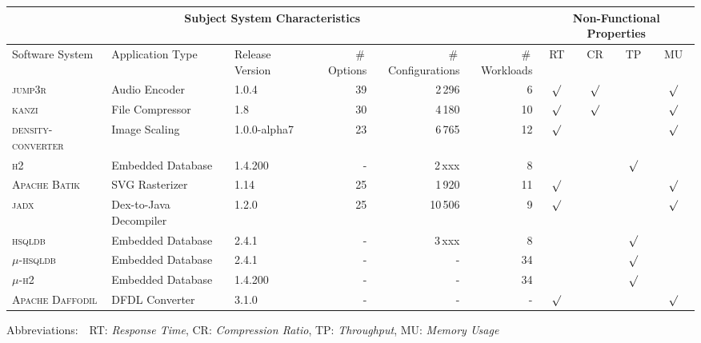 \begin{tabular}{lllrrr|cccc}
		\toprule
		\multicolumn{6}{c}{\textbf{Subject System Characteristics}} & \multicolumn{4}{c}{\textbf{Non-Functional Properties}} \\
		\midrule
		Software System &  Application Type & Release Version & \#\,Options & \#\,Configurations & \#\,Workloads & RT & CR & TP & MU \\
		\midrule
		\rowcolor{ForestGreen!50}
		\textsc{jump3r} & Audio Encoder & 1.0.4 & 39 & {\color{Brown}2\,296} & 6 & $\surd$ & $\surd$ &  & $\surd$  \\
		
		\rowcolor{ForestGreen!50}	
		\textsc{kanzi} & File Compressor & 1.8 & 30 & {\color{Brown}4\,180} & 10 & $\surd$ & $\surd$ &  & $\surd$  \\
		
		\rowcolor{ForestGreen!50}	
		\textsc{density-converter} & Image Scaling & 1.0.0-alpha7 & 23 & 6\,765 & 12 & $\surd$  &  &  & $\surd$  \\
				
		\rowcolor{ForestGreen!50}	
		\textsc{h2} & Embedded Database & 1.4.200 & - & 2\,xxx  & 8 &   &  & $\surd$ &  \\
		
		\rowcolor{ForestGreen!50}
		\textsc{Apache Batik} & SVG Rasterizer & 1.14 & 25 & 1\,920 &  11 & $\surd$ &   &  & $\surd$  \\
		
		\rowcolor{ForestGreen!25}
		\textsc{jadx} & Dex-to-Java Decompiler & 1.2.0 & 25 & 10\,506 & 9 & $\surd$ &  &  & $\surd$  \\
		

		\rowcolor{Red!25}	
		\textsc{hsqldb} & Embedded Database & 2.4.1 & - & 3\,xxx & 8  &  &  & $\surd$ &  \\
		

		\midrule
		\rowcolor{Black!10}	
		$\mu$-\textsc{hsqldb} & Embedded Database & 2.4.1 & - & - & 34  &  &  & $\surd$ &  \\
		
		\rowcolor{Black!10}	
		$\mu$-\textsc{h2} & Embedded Database & 1.4.200 & - & -  & 34 &   &  & $\surd$ &  \\
		
		\midrule		
		\rowcolor{Black!10}
		\textsc{Apache Daffodil} & DFDL Converter & 3.1.0 & - & - & -  & $\surd$ &  &   & $\surd$ \\
		
		
		\bottomrule
	\end{tabular}
	
	{\vspace{2mm}
	{Abbreviations:$\quad$RT: \textit{Response Time}, CR: \textit{Compression Ratio}, TP: \textit{Throughput}, MU: \textit{Memory Usage}}}
	\vspace{0.1cm}
